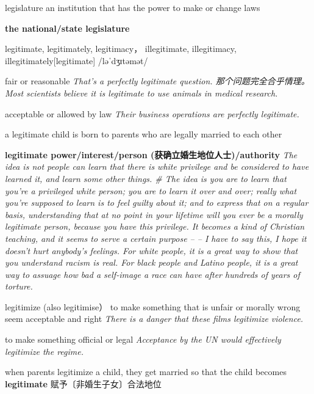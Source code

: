 \begin{DefWord}{legislature}
    an institution that has the power to make or change laws

    \textbf{the national/state legislature}
\end{DefWord}

\begin{DefWord}{legitimate, legitimately, legitimacy， illegitimate, illegitimacy, illegitimately}[legitimate]
    /ləˈdʒɪtəmət/

    fair or reasonable
    \textit{That’s a perfectly legitimate question. 那个问题完全合乎情理。}
    \textit{Most scientists believe it is legitimate to use animals in medical research.}

    acceptable or allowed by law
    \textit{Their business operations are perfectly legitimate.}

    a legitimate child is born to parents who are legally married to each other

    \textbf{legitimate power/interest/person (获确立婚生地位人士)/authority}
    \textit{The idea is not people can learn that there is white privilege and be considered to have learned it, and learn some other things. \# The idea is you are to learn that you're a privileged white person; you are to learn it over and over; really what you're supposed to learn is to feel guilty about it; and to express that on a regular basis, understanding that at no point in your lifetime will you ever be a morally legitimate person, because you have this privilege. It becomes a kind of Christian teaching, and it seems to serve a certain purpose -- -- I have to say this, I hope it doesn't hurt anybody's feelings. For white people, it is a great way to show that you understand racism is real. For black people and Latino people, it is a great way to assuage how bad a self-image a race can have after hundreds of years of torture. }
\end{DefWord}

\begin{DefWord}{legitimize (also legitimise）}
    to make something that is unfair or morally wrong seem acceptable and right
    \textit{There is a danger that these films legitimize violence.}

    to make something official or legal
    \textit{Acceptance by the UN would effectively legitimize the regime.}

    when parents legitimize a child, they get married so that the child becomes \textbf{legitimate} 赋予〔非婚生子女〕合法地位

\end{DefWord}

